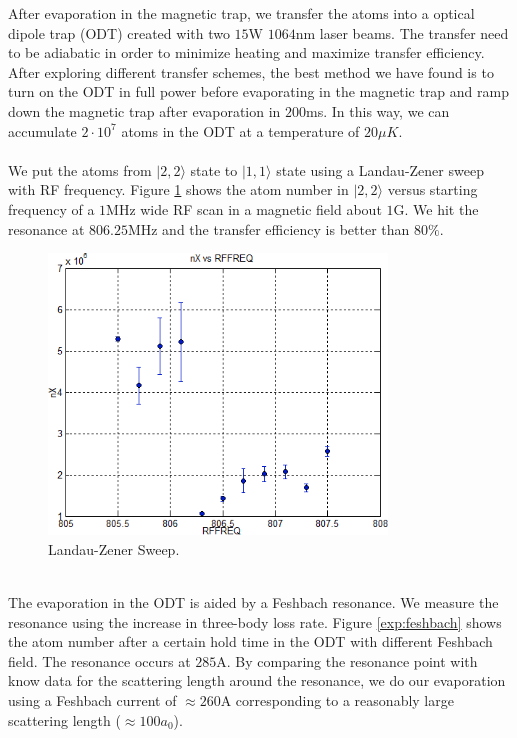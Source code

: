 After evaporation in the magnetic trap, we transfer the atoms into a optical dipole trap (ODT) created with two $15$W $1064$nm laser beams. The transfer need to be adiabatic in order to minimize heating and maximize transfer efficiency. After exploring different transfer schemes, the best method we have found is to turn on the ODT in full power before evaporating in the magnetic trap and ramp down the magnetic trap after evaporation in $200$ms. In this way, we can accumulate $2\cdot10^7$ atoms in the ODT at a temperature of $20\mu K$.\\
\\
We put the atoms from $|2, 2\rangle$ state to $|1, 1\rangle$ state using a Landau-Zener sweep with RF frequency. Figure \ref{exp:landao-zener} shows the atom number in $|2, 2\rangle$ versus starting frequency of a $1$MHz wide RF scan in a magnetic field about $1$G. We hit the resonance at $806.25$MHz and the transfer efficiency is better than $80\%$.\\
\begin{figure}
  \begin{center}
    \includegraphics[width=9cm]{landao-zener.png}
  \end{center}
  \caption{Landau-Zener Sweep.}
  \label{exp:landao-zener}
\end{figure}\\
The evaporation in the ODT is aided by a Feshbach resonance. We measure the resonance using the increase in three-body loss rate. Figure \ref{exp:feshbach} shows the atom number after a certain hold time in the ODT with different Feshbach field. The resonance occurs at $285$A. By comparing the resonance point with know data for the scattering length around the resonance, we do our evaporation using a Feshbach current of $\approx260$A corresponding to a reasonably large scattering length ($\approx100a_0$).
